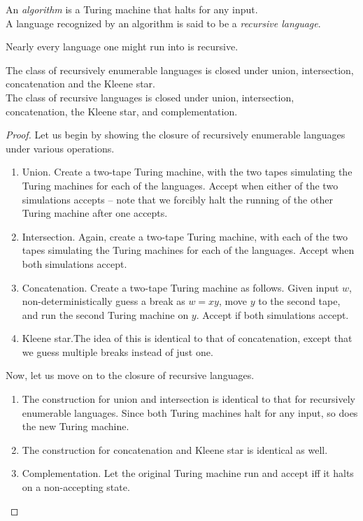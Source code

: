 	\begin{definition}[Algorithm]
		An \emph{algorithm} is a Turing machine that halts for any input.\\
		A language recognized by an algorithm is said to be a \emph{recursive language}.
	\end{definition}

	Nearly every language one might run into is recursive.

	\begin{ftheo}
		The class of recursively enumerable languages is closed under union, intersection, concatenation and the Kleene star.\\
		The class of recursive languages is closed under union, intersection, concatenation, the Kleene star, and complementation.
	\end{ftheo}
	\begin{proof}
		Let us begin by showing the closure of recursively enumerable languages under various operations.
		\begin{enumerate}
			\item Union. Create a two-tape Turing machine, with the two tapes simulating the Turing machines for each of the languages. Accept when either of the two simulations accepts -- note that we forcibly halt the running of the other Turing machine after one accepts.
			\item Intersection. Again, create a two-tape Turing machine, with each of the two tapes simulating the Turing machines for each of the languages. Accept when both simulations accept.
			\item Concatenation. Create a two-tape Turing machine as follows. Given input $w$, non-deterministically guess a break as $w=xy$, move $y$ to the second tape, and run the second Turing machine on $y$. Accept if both simulations accept.
			\item Kleene star.The idea of this is identical to that of concatenation, except that we guess multiple breaks instead of just one.
		\end{enumerate}
		Now, let us move on to the closure of recursive languages.
		\begin{enumerate}
			\item The construction for union and intersection is identical to that for recursively enumerable languages. Since both Turing machines halt for any input, so does the new Turing machine.
			\item The construction for concatenation and Kleene star is identical as well. %
			\item Complementation. Let the original Turing machine run and accept iff it halts on a non-accepting state.
		\end{enumerate}
	\end{proof}

